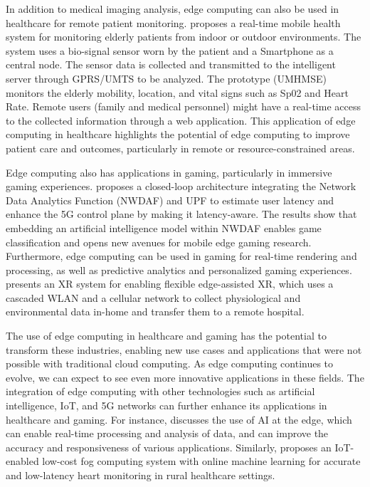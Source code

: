 \documentclass[11pt]{article}
\begin{document}
In addition to medical imaging analysis, edge computing can also be used in healthcare for remote patient monitoring. \cite{ref52} proposes a real-time mobile health system for monitoring elderly patients from indoor or outdoor environments. The system uses a bio-signal sensor worn by the patient and a Smartphone as a central node. The sensor data is collected and transmitted to the intelligent server through GPRS/UMTS to be analyzed. The prototype (UMHMSE) monitors the elderly mobility, location, and vital signs such as Sp02 and Heart Rate. Remote users (family and medical personnel) might have a real-time access to the collected information through a web application. This application of edge computing in healthcare highlights the potential of edge computing to improve patient care and outcomes, particularly in remote or resource-constrained areas.

Edge computing also has applications in gaming, particularly in immersive gaming experiences. \cite{ref53} proposes a closed-loop architecture integrating the Network Data Analytics Function (NWDAF) and UPF to estimate user latency and enhance the 5G control plane by making it latency-aware. The results show that embedding an artificial intelligence model within NWDAF enables game classification and opens new avenues for mobile edge gaming research. Furthermore, edge computing can be used in gaming for real-time rendering and processing, as well as predictive analytics and personalized gaming experiences. \cite{ref54} presents an XR system for enabling flexible edge-assisted XR, which uses a cascaded WLAN and a cellular network to collect physiological and environmental data in-home and transfer them to a remote hospital.

The use of edge computing in healthcare and gaming has the potential to transform these industries, enabling new use cases and applications that were not possible with traditional cloud computing. As edge computing continues to evolve, we can expect to see even more innovative applications in these fields. The integration of edge computing with other technologies such as artificial intelligence, IoT, and 5G networks can further enhance its applications in healthcare and gaming. For instance, \cite{ref55} discusses the use of AI at the edge, which can enable real-time processing and analysis of data, and can improve the accuracy and responsiveness of various applications. Similarly, \cite{ref56} proposes an IoT-enabled low-cost fog computing system with online machine learning for accurate and low-latency heart monitoring in rural healthcare settings.
\end{document}
